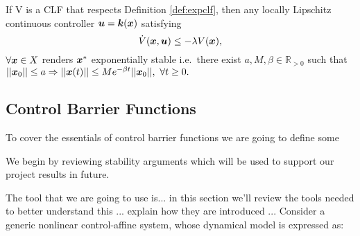 \begin{theorem}\label{th:clftexp}
If V is a CLF that respects Definition \ref{def:expclf}, then any locally Lipschitz continuous controller $\boldsymbol{u}=\boldsymbol{k}(\boldsymbol{x})$ satisfying 
\begin{equation}
\dot{V}(\boldsymbol{x},\boldsymbol{u}) \leq -\lambda V(\boldsymbol{x}),
\end{equation}
$\forall \boldsymbol{x} \in X$ renders $\boldsymbol{x}^*$ exponentially stable i.e.~there exist $a,M,\beta \in \mathbb{R}_{>0}$ such that 
$|| \boldsymbol{x}_0 || \leq a \Rightarrow || \boldsymbol{x}(t) || \leq Me^{-\beta t}|| \boldsymbol{x}_0 ||,~\forall t\geq 0.$
\end{theorem}

\subsection{Control Barrier Functions}
To cover the essentials of control barrier functions we are going to define some 

We begin by reviewing stability arguments which will be used to support our project results in future.


The tool that we are going to use is... in this section we'll review the tools needed to better understand this ... explain how they are introduced  ...
Consider a generic nonlinear control-affine system, whose dynamical model is expressed as:

